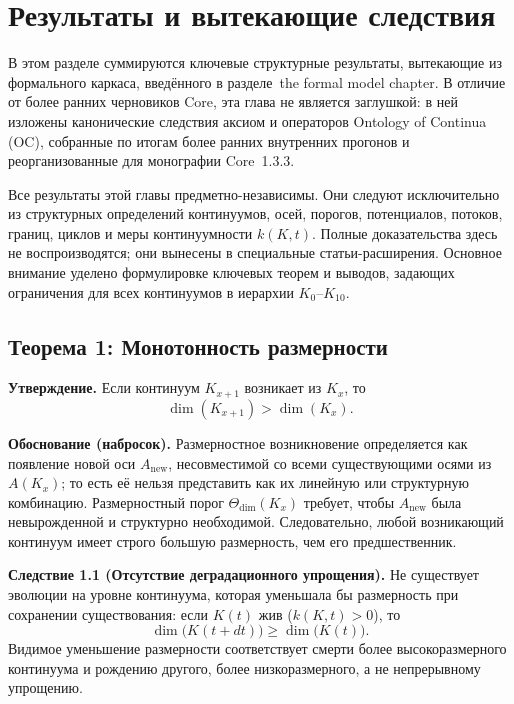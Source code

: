 \section{Результаты и вытекающие следствия}
\label{sec:results}

В этом разделе суммируются ключевые структурные результаты, вытекающие из формального каркаса, введённого в разделе~the formal model chapter.
В отличие от более ранних черновиков Core, эта глава не является заглушкой: в ней изложены канонические следствия аксиом и операторов Ontology of Continua (OC), собранные по итогам более ранних внутренних прогонов и реорганизованные для монографии Core~1.3.3.

Все результаты этой главы предметно-независимы.
Они следуют исключительно из структурных определений континуумов, осей, порогов, потенциалов, потоков, границ, циклов и меры континуумности \(k(K,t)\).
Полные доказательства здесь не воспроизводятся; они вынесены в специальные статьи-расширения.
Основное внимание уделено формулировке ключевых теорем и выводов, задающих ограничения для всех континуумов в иерархии \(K_0\)–\(K_{10}\).

\subsection{Теорема 1: Монотонность размерности}

\textbf{Утверждение.}
Если континуум \(K_{x+1}\) возникает из \(K_x\), то
\[
    \dim(K_{x+1}) > \dim(K_x).
\]

\textbf{Обоснование (набросок).}
Размерностное возникновение определяется как появление новой оси \(A_{\mathrm{new}}\), несовместимой со всеми существующими осями из \(A(K_x)\); то есть её нельзя представить как их линейную или структурную комбинацию.
Размерностный порог \(\Theta_{\mathrm{dim}}(K_x)\) требует, чтобы \(A_{\mathrm{new}}\) была невырожденной и структурно необходимой.
Следовательно, любой возникающий континуум имеет строго большую размерность, чем его предшественник.

\textbf{Следствие 1.1 (Отсутствие деградационного упрощения).}
Не существует эволюции на уровне континуума, которая уменьшала бы размерность при сохранении существования:
если \(K(t)\) жив (\(k(K,t) > 0\)), то
\[
    \dim\big(K(t+dt)\big) \ge \dim\big(K(t)\big).
\]
Видимое уменьшение размерности соответствует смерти более высокоразмерного континуума и рождению другого, более низкоразмерного, а не непрерывному упрощению.

